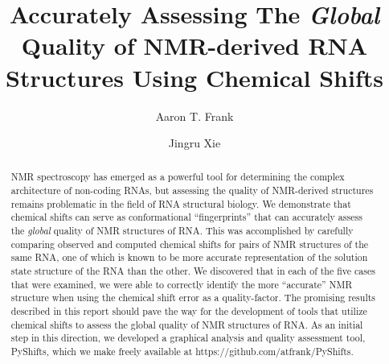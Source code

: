 \documentclass[fleqn,10pt]{wlscirep}
\begin{document}
\title{Accurately Assessing The \textit{Global} Quality of NMR-derived RNA Structures Using Chemical Shifts}
\author[1,2*]{Aaron T. Frank}
\author[3]{Jingru Xie}
\begin{abstract}
NMR spectroscopy has emerged as a powerful tool for determining the complex architecture of non-coding RNAs, but assessing the quality of NMR-derived structures remains problematic in the field of RNA structural biology. We demonstrate that chemical shifts can serve as conformational ``fingerprints'' that can accurately assess the \textit{global} quality of NMR structures of RNA. This was accomplished by carefully comparing observed and computed chemical shifts for pairs of NMR structures of the same RNA, one of which is known to be more accurate representation of the solution state structure of the RNA than the other. We discovered that in each of the five cases that were examined, we were able to correctly identify the more ``accurate'' NMR structure when using the chemical shift error as a quality-factor. The promising results described in this report should pave the way for the development of tools that utilize chemical shifts to assess the global quality of NMR structures of RNA. As an initial step in this direction, we developed a graphical analysis and quality assessment tool, PyShifts, which we make freely available at https://github.com/atfrank/PyShifts. 
\end{abstract}
\flushbottom
\maketitle
%
%
\thispagestyle{empty}
\end{document}
